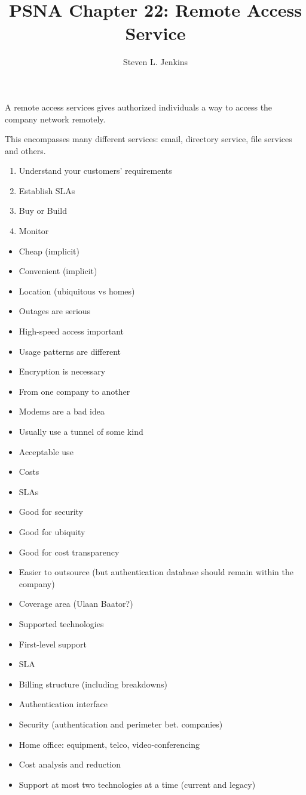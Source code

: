 \documentclass{slides}
\title{PSNA Chapter 22: Remote Access Service}
\author{Steven L. Jenkins}
\newcommand{\bi}{\begin{itemize}}
\newcommand{\ei}{\end{itemize}}
\newcommand{\be}{\begin{enumerate}}
\newcommand{\ee}{\end{enumerate}}
\begin{document}

A remote access services gives authorized individuals a way to access
the company network remotely.

This encompasses many different services: email, directory service,
file services and others.


\be
\item Understand your customers' requirements
\item Establish SLAs
\item Buy or Build
\item  Monitor
\ee


\bi
\item Cheap (implicit)
\item Convenient (implicit)
\item Location (ubiquitous vs homes)
\ei


\bi
\item Outages are serious
\item High-speed access important
\item Usage patterns are different
\item Encryption is necessary
\ei


\bi
\item From one company to another
\item Modems are a bad idea
\item Usually use a tunnel of some kind
\ei


\bi
\item Acceptable use
\item Costs
\item SLAs
\ei


\bi
\item Good for security
\item Good for ubiquity
\item Good for cost transparency
\item Easier to outsource (but authentication database should
  remain within the company)
\ei


\bi
\item Coverage area (Ulaan Baator?)
\item Supported technologies
\item First-level support
\item SLA
\item Billing structure (including breakdowns)
\item Authentication interface
\item Security (authentication and perimeter bet. companies)
\ei



\bi
\item Home office: equipment, telco, video-conferencing
\item Cost analysis and reduction
\item Support at most two technologies at a time (current and legacy)
\ei
\end{document}
